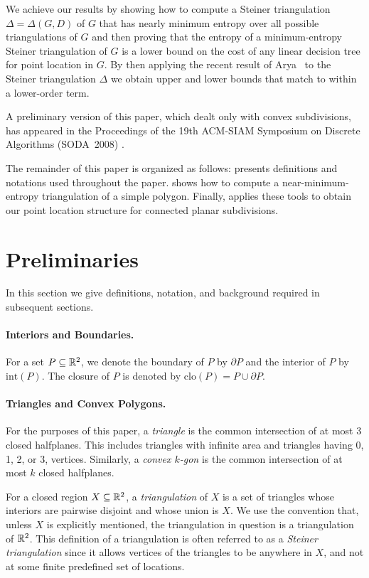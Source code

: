 \documentclass[lotsofwhite]{patmorin}
\newcommand{\boundary}{\partial}
\newcommand{\closure}{\mathrm{clo}}
\newcommand{\interior}{\mathrm{int}}
\begin{document}
We achieve our results by showing how to compute a Steiner
triangulation $\Delta=\Delta(G,D)$ of $G$ that has nearly minimum
entropy over all possible triangulations of $G$ and then proving that
the entropy of a minimum-entropy Steiner triangulation of $G$ is a
lower bound on the cost of any linear decision tree for point location
in $G$.  By then applying the recent result of Arya \etal\ to the
Steiner triangulation $\Delta$ we obtain upper and lower bounds that
match to within a lower-order term.


A preliminary version of this paper, which dealt only with convex
subdivisions, has appeared in the Proceedings of the 19th ACM-SIAM
Symposium on Discrete Algorithms (SODA~2008) \cite{cdilm08}.

The remainder of this paper is organized as follows:  
presents definitions and notations used throughout the paper.
 shows how to compute a near-minimum-entropy
triangulation of a simple polygon.  Finally, 
applies these tools to obtain our point location structure for
connected planar subdivisions.


\section{Preliminaries}

In this section we give definitions, notation, and background
required in subsequent sections.

\paragraph{Interiors and Boundaries.}
For a set $P\subseteq \mathbb{R}^2$, we denote the boundary of $P$ by $\boundary P$
and the interior of $P$ by $\interior(P)$.  The closure of $P$
is denoted by $\closure(P) = P\cup{\boundary P}$.


\paragraph{Triangles and Convex Polygons.}  For the purposes of this
paper, a \emph{triangle} is the common intersection of at most 3
closed halfplanes.  This includes triangles with infinite area and
triangles having 0, 1, 2, or 3, vertices. Similarly, a \emph{convex
$k$-gon} is the common intersection of at most $k$ closed halfplanes.

For a closed region $X\subseteq \mathbb{R}^2$, a \emph{triangulation} of $X$
is a set of triangles whose interiors are pairwise disjoint and whose
union is $X$.  We use the convention that, unless $X$ is explicitly
mentioned, the triangulation in question is a triangulation of $\mathbb{R}^2$.
This definition of a triangulation is often referred to as a
\emph{Steiner triangulation} since it allows vertices of the triangles
to be anywhere in $X$, and not at some finite predefined set of
locations.
\end{document}
